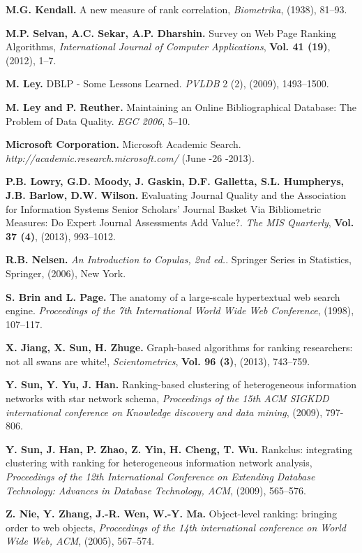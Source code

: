 \documentclass[10pt,leqno,twoside]{article}
\begin{document}
\begin{thebibliography}{99}
\textbf{M.G. Kendall.}
A new measure of rank correlation,
\textit{Biometrika}, (1938), 81--93.

\textbf{M.P. Selvan, A.C. Sekar, A.P. Dharshin.}
Survey on Web Page Ranking Algorithms,
\textit{International Journal of Computer Applications},
\textbf{Vol. 41 (19)}, (2012), 1--7.
%

\textbf{M. Ley.}
DBLP - Some Lessons Learned.
\textit{PVLDB} 2 (2), (2009), 1493--1500.


\textbf{M. Ley and P. Reuther.}
Maintaining an Online Bibliographical Database: The Problem of Data Quality.
\textit{EGC 2006}, 5--10.

\textbf{Microsoft  Corporation.}
Microsoft Academic Search.
\textit{http://academic.research.microsoft.com/} (June -26 -2013).

\textbf{P.B. Lowry, G.D. Moody, J. Gaskin, D.F. Galletta, S.L. Humpherys, J.B. Barlow, D.W. Wilson.}
Evaluating Journal Quality and the Association for Information Systems Senior Scholars' Journal Basket Via Bibliometric Measures: Do Expert Journal Assessments Add Value?.
\textit{The MIS Quarterly},
\textbf{Vol. 37 (4)}, (2013), 993--1012.

%
\textbf{R.B. Nelsen.}
\textit{An Introduction to Copulas, 2nd ed.}.
Springer Series in Statistics, Springer, (2006), New York.


\textbf{S. Brin and L. Page.}
The anatomy of a large-scale hypertextual web search engine.
\textit{Proceedings of the 7th International World Wide Web Conference}, (1998), 107--117.


\textbf{X. Jiang, X. Sun, H. Zhuge.} Graph-based algorithms for ranking researchers: not all swans are white!,
\textit{Scientometrics},
\textbf{Vol. 96 (3)}, (2013), 743--759.

\textbf{Y. Sun, Y. Yu, J. Han.}
Ranking-based clustering of heterogeneous information networks with star network schema,
\textit{Proceedings of the 15th ACM SIGKDD international conference on Knowledge discovery and data mining},
(2009), 797-806.

\textbf{Y. Sun, J. Han, P. Zhao, Z. Yin, H. Cheng, T. Wu.}
Rankclus: integrating clustering with ranking for heterogeneous information network analysis,
\textit{Proceedings of the 12th International Conference on Extending Database Technology: Advances in Database Technology, ACM}, (2009), 565--576.

\textbf{Z. Nie, Y. Zhang, J.-R. Wen, W.-Y. Ma.}
Object-level ranking: bringing order to web objects,
\textit{Proceedings of the 14th international conference on World Wide Web, ACM}, (2005), 567--574.


\end{thebibliography}
\vspace{2cm}
\end{document}

